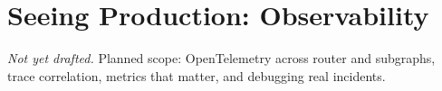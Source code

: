\chapter{Seeing Production: Observability}
\label{ch:observability}

\emph{Not yet drafted.} Planned scope: OpenTelemetry across router and subgraphs, trace correlation, metrics that matter, and debugging real incidents.

% 
